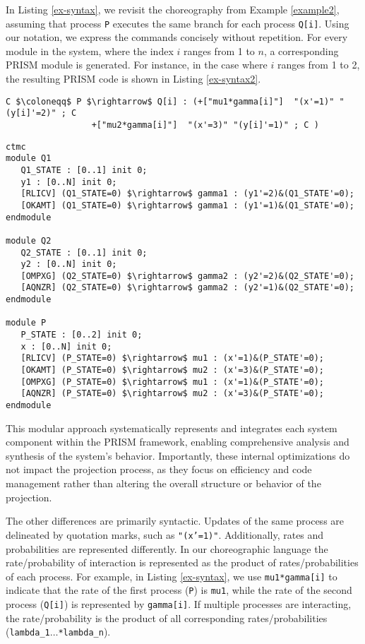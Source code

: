 In Listing \ref{ex-syntax}, we revisit the choreography from Example \ref{example2}, assuming that process \texttt{P} executes the same branch for each process \texttt{Q[i]}. Using our notation, we express the commands concisely without repetition. For every module in the system, where the index $i$ ranges from 1 to $n$, a corresponding PRISM module is generated. For instance, in the case where $i$ ranges from 1 to 2, the resulting PRISM code is shown in Listing \ref{ex-syntax2}.
\begin{lstlisting}[style=chor-color,breaklines=true, postbreak=\mbox{\textcolor{red}{$\hookrightarrow$}\space},caption={Example of an use of parameterization in the choreographic language},captionpos=b,label={ex-syntax}]
	C $\coloneqq$ P $\rightarrow$ Q[i] : (+["mu1*gamma[i]"]  "(x'=1)" "(y[i]'=2)" ; C
			     +["mu2*gamma[i]"]  "(x'=3)" "(y[i]'=1)" ; C )
\end{lstlisting}
\begin{lstlisting}[style=prism-color,caption={PRISM code generated for the choreography in Listing \ref{ex-syntax}},captionpos=b,label={ex-syntax2}]
ctmc
module Q1
   Q1_STATE : [0..1] init 0;
   y1 : [0..N] init 0;
   [RLICV] (Q1_STATE=0) $\rightarrow$ gamma1 : (y1'=2)&(Q1_STATE'=0);
   [OKAMT] (Q1_STATE=0) $\rightarrow$ gamma1 : (y1'=1)&(Q1_STATE'=0);
endmodule

module Q2
   Q2_STATE : [0..1] init 0;
   y2 : [0..N] init 0;
   [OMPXG] (Q2_STATE=0) $\rightarrow$ gamma2 : (y2'=2)&(Q2_STATE'=0);
   [AQNZR] (Q2_STATE=0) $\rightarrow$ gamma2 : (y2'=1)&(Q2_STATE'=0);
endmodule

module P
   P_STATE : [0..2] init 0;
   x : [0..N] init 0;
   [RLICV] (P_STATE=0) $\rightarrow$ mu1 : (x'=1)&(P_STATE'=0);
   [OKAMT] (P_STATE=0) $\rightarrow$ mu2 : (x'=3)&(P_STATE'=0);
   [OMPXG] (P_STATE=0) $\rightarrow$ mu1 : (x'=1)&(P_STATE'=0);
   [AQNZR] (P_STATE=0) $\rightarrow$ mu2 : (x'=3)&(P_STATE'=0);
endmodule
\end{lstlisting}
This modular approach systematically represents and integrates each system component within the PRISM framework, enabling comprehensive analysis and synthesis of the system's behavior. Importantly, these internal optimizations do not impact the projection process, as they focus on efficiency and code management rather than altering the overall structure or behavior of the projection. %

The other differences are primarily syntactic. Updates of the same process are delineated by quotation marks, such as \texttt{"(x'=1)"}. Additionally, rates and probabilities are represented differently. In our choreographic language the rate/probability of interaction is represented as the product of rates/probabilities of each process. For example, in Listing \ref{ex-syntax}, we use \texttt{mu1*gamma[i]} to indicate that the rate of the first process (\texttt{P}) is \texttt{mu1}, while the rate of the second process (\texttt{Q[i]}) is represented by \texttt{gamma[i]}. If multiple processes are interacting, the rate/probability is the product of all corresponding rates/probabilities (\texttt{lambda\_1$\ldots$*lambda\_n}).

